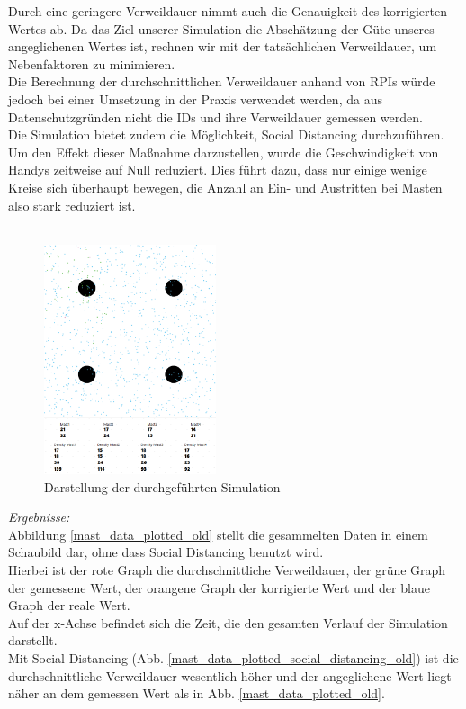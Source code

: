 \documentclass[conference,compsoc]{IEEEtran}
\begin{document}
Durch eine geringere Verweildauer nimmt auch die Genauigkeit des korrigierten Wertes ab. Da das Ziel unserer Simulation die Abschätzung der Güte unseres angeglichenen Wertes ist, rechnen wir mit der tatsächlichen Verweildauer, um Nebenfaktoren zu minimieren.\\ 
Die Berechnung der durchschnittlichen Verweildauer anhand von RPIs würde jedoch bei einer Umsetzung in der Praxis verwendet werden, da aus Datenschutzgründen nicht die IDs und ihre Verweildauer gemessen werden.\\
Die Simulation bietet zudem die Möglichkeit, Social Distancing durchzuführen. Um den Effekt dieser Maßnahme darzustellen, wurde die Geschwindigkeit von Handys zeitweise auf Null reduziert. Dies führt dazu, dass nur einige wenige Kreise sich überhaupt bewegen, die Anzahl an Ein- und Austritten bei Masten also stark reduziert ist.\\ \\
\begin{figure}[h]
	\centering
	\includegraphics[width=0.45\textwidth]{"Simulation"}
	\caption{Darstellung der durchgeführten Simulation}
	\label{sim}
\end{figure}
\textit{Ergebnisse:}\\
Abbildung \ref{mast_data_plotted_old} stellt die gesammelten Daten in einem Schaubild dar, ohne dass Social Distancing benutzt wird.\\
Hierbei ist der rote Graph die durchschnittliche Verweildauer, der grüne Graph der gemessene Wert, der orangene Graph der korrigierte Wert und der blaue Graph der reale Wert.\\
Auf der x-Achse befindet sich die Zeit, die den gesamten Verlauf der Simulation darstellt.\\
Mit Social Distancing (Abb. \ref{mast_data_plotted_social_distancing_old}) ist die durchschnittliche Verweildauer wesentlich höher und der angeglichene Wert liegt näher an dem gemessen Wert als in Abb. \ref{mast_data_plotted_old}. \\ \\
\end{document}
